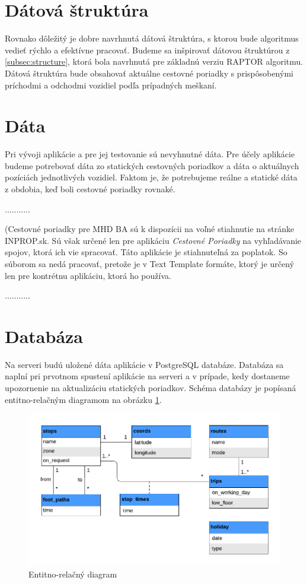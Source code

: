 \section{Dátová štruktúra}
Rovnako dôležitý je dobre navrhnutá dátová štruktúra, s ktorou bude algoritmus vedieť rýchlo a efektívne pracovať. Budeme sa inšpirovať dátovou štruktúrou z \ref{subsec:structure}, ktorá bola navrhnutá pre základnú verziu RAPTOR algoritmu. Dátová štruktúra bude obsahovať aktuálne cestovné poriadky s prispôsobenými príchodmi a odchodmi vozidiel podľa prípadných meškaní.  

\section{Dáta}
Pri vývoji aplikácie a pre jej testovanie sú nevyhnutné dáta. Pre účely aplikácie budeme potrebovať dáta zo statických cestovných poriadkov a dáta o aktuálnych pozíciách jednotlivých vozidiel. Faktom je, že potrebujeme reálne a statické dáta z obdobia, keď boli cestovné poriadky rovnaké. 

...........

(Cestovné poriadky pre MHD BA sú k dispozícii na voľné stiahnutie na stránke INPROP.sk. Sú však určené len pre aplikáciu \textit{Cestovné Poriadky} na vyhľadávanie spojov, ktorá ich vie spracovať. Táto aplikácie je stiahnuteľná za poplatok. So súborom sa nedá pracovať, pretože je v Text Template formáte, ktorý je určený len pre kontrétnu aplikáciu, ktorá ho používa. 

...........

\section{Databáza}

Na serveri budú uložené dáta aplikácie v PostgreSQL databáze. Databáza sa naplní pri prvotnom spustení aplikácie na serveri a v prípade, kedy dostaneme upozornenie na aktualizáciu statických poriadkov. Schéma databázy je popísaná entitno-relačným diagramom na obrázku \ref{fig:erd}.

\begin{figure}[H]
\centerline{\includegraphics[width=1.0\textwidth]{images/ERD}}
\caption[Entitno-relačný diagram]{Entitno-relačný diagram}
\label{fig:erd}
\end{figure}

